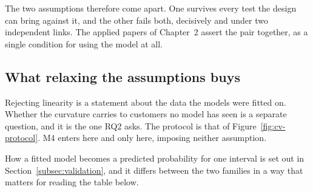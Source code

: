 The two assumptions therefore come apart. One survives every test the design can bring against it, and the other fails both, decisively and under two independent links. The applied papers of Chapter~2 assert the pair together, as a single condition for using the model at all.
 
 
\subsection{What relaxing the assumptions buys}
\label{subsec:res-oof}
 
Rejecting linearity is a statement about the data the models were fitted on. Whether the curvature carries to customers no model has seen is a separate question, and it is the one RQ2 asks. The protocol is that of Figure~\ref{fig:cv-protocol}. M4 enters here and only here, imposing neither assumption.
 
%
How a fitted model becomes a predicted probability for one interval is set out in Section~\ref{subsec:validation}, and it differs between the two families in a way that matters for reading the table below.
 
